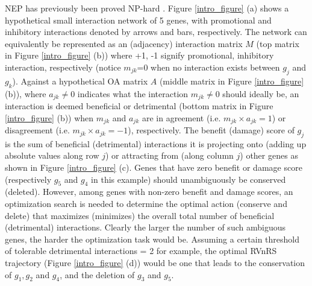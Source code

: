 NEP has previously been proved NP-hard \cite{atiia_computational_2017-1}. Figure \ref{intro_figure} (a) shows a hypothetical small interaction network of 5 genes, 
with promotional and inhibitory interactions denoted by arrows and bars, respectively. The network can equivalently be represented as an (adjacency) 
interaction matrix $M$ (top matrix in Figure \ref{intro_figure} (b)) where +1, -1 signify promotional, inhibitory interaction, respectively 
(notice $m_{jk}$=0  when no interaction exists 
between $g_j$ and $g_k$). Against a hypothetical OA matrix $A$ (middle matrix in Figure \ref{intro_figure} (b)), where $a_{jk}\neq 0$ indicates 
what the interaction  $m_{jk}\neq 0$ should ideally be, an interaction is deemed beneficial or detrimental (bottom matrix in Figure \ref{intro_figure} (b)) 
when $m_{jk}$ and $a_{jk}$ are in agreement  
(i.e. $m_{jk}\times a_{jk}=1$) or disagreement (i.e. $m_{jk}\times a_{jk}=-1$), respectively. 
The benefit (damage) score of $g_j$ is the sum of beneficial (detrimental) interactions it is projecting onto (adding up absolute values along row $j$) 
or attracting from (along column $j$) other genes as shown in Figure \ref{intro_figure} (c). 
Genes that have zero benefit or damage score (respectively $g_5$ and $g_4$ in this example) should unambiguously be conserved (deleted). However, among 
genes with non-zero benefit and damage scores, an optimization search is needed to determine the optimal action (conserve and delete) that maximizes 
(minimizes) the overall total number of beneficial (detrimental) interactions. 
Clearly the larger the number of such ambiguous genes, the harder the optimization task would be. Assuming a certain threshold of tolerable detrimental interactions = 2 
for example, the optimal RVnRS trajectory (Figure \ref{intro_figure} (d)) would be one that leads to the conservation of $g_1,g_2$ and $g_4$, and the deletion of $g_3$ and $g_5$. 

%
